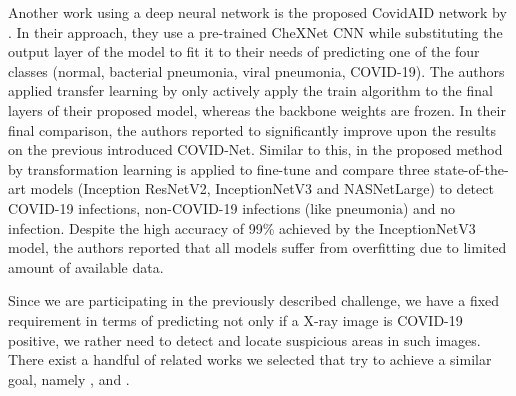 Another work using a deep neural network is the proposed CovidAID \autocite{mangal2020covidaid} network by \citeauthor{mangal2020covidaid}. In their approach, they use a pre-trained CheXNet \autocite{rajpurkar2017chexnet} \ac{CNN} while substituting the output layer of the model to fit it to their needs of predicting one of the four classes (normal, bacterial pneumonia, viral pneumonia, COVID-19). The authors applied transfer learning by only actively apply the train algorithm to the final layers of their proposed model, whereas the backbone weights are frozen.
In their final comparison, the authors reported to significantly improve upon the results on the previous introduced COVID-Net.
Similar to this, in the proposed method \autocite{CoronaDLTransfer} by \citeauthor{CoronaDLTransfer} transformation learning is applied to fine-tune and compare three state-of-the-art models (Inception ResNetV2, InceptionNetV3 and NASNetLarge) to detect COVID-19 infections, non-COVID-19 infections (like pneumonia) and no infection. Despite the high accuracy of 99\% achieved by the InceptionNetV3 model, the authors reported that all models suffer from overfitting due to limited amount of available data.

Since we are participating in the previously described challenge, we have a fixed requirement in terms of predicting not only if a X-ray image is COVID-19 positive, we rather need to detect and locate suspicious areas in such images. There exist a handful of related works we selected that try to achieve a similar goal, namely \autocite{brunese2020explainable}, \autocite{fan2020inf} and \autocite{al2021fast}.

